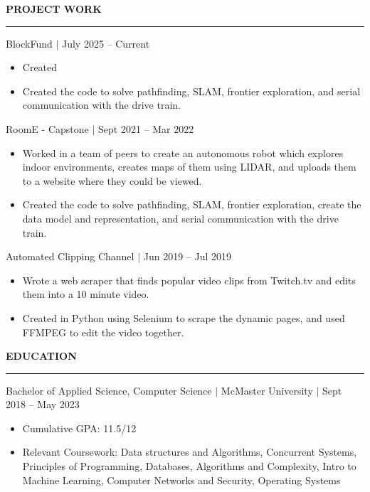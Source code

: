 \documentclass[12pt]{article}
\newcommand{\sectionRule}{\textcolor{gray}{\rule{7.27in}{0.02cm}}}
\newcommand{\sectionTxt}[1]{\noindent\textbf{#1}\\}
\newcommand{\textDate}[3]{\noindent#1 $|$ #2 $|$ {\color{textGray} #3}}
\newcommand{\projText}[2]{\noindent#1 $|$ {\color{textGray} #2}}
\begin{document}
    \newpage

    \sectionTxt{PROJECT WORK}
    \sectionRule
    
    \projText{BlockFund}{July 2025 -- Current}
    \begin{small}
        \begin{itemize}
            \itemsep0em 
            \item {Created }
            \item {Created the code to solve pathfinding, SLAM, frontier exploration, and serial communication with the drive train. }
        \end{itemize}
    \end{small}

    \projText{RoomE - Capstone}{Sept 2021 -- Mar 2022}
    \begin{small}
        \begin{itemize}
            \itemsep0em 
            \item {Worked in a team of peers to create an autonomous robot which explores indoor environments, creates maps of them using LIDAR, and uploads them to a website where they could be viewed.}
            \item {Created the code to solve pathfinding, SLAM, frontier exploration, create the data model and representation, and serial communication with the drive train. }
        \end{itemize}
    \end{small}

    \projText{Automated Clipping Channel}{Jun 2019 -- Jul 2019}
    \begin{small}
        \begin{itemize}
            \itemsep0em
            \item {\color{textGray} Wrote a web scraper that finds popular video clips from Twitch.tv and edits them into a 10 minute video.}
            \item {\color{textGray} Created in Python using Selenium to scrape the dynamic pages, and used FFMPEG to edit the video together.}
        \end{itemize}
    \end{small}

    \sectionTxt{EDUCATION}
    \sectionRule

    \textDate{Bachelor of Applied Science, Computer Science}{McMaster University}{Sept 2018 -- May 2023}
    \begin{small}
        \begin{itemize}
            \itemsep0em 
            \item Cumulative GPA: {11.5/12}
            \item Relevant Coursework: {Data structures and Algorithms, Concurrent Systems, Principles of Programming, Databases, Algorithms and Complexity, Intro to Machine Learning, Computer Networks and Security, Operating Systems}
        \end{itemize}
    \end{small}
\end{document}
